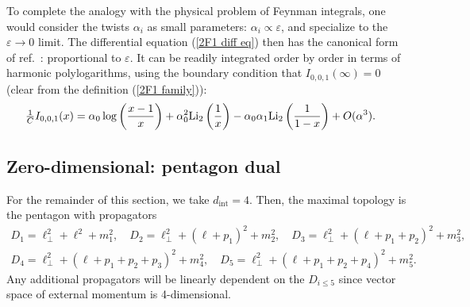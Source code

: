 \documentclass[11pt]{article}
\newcommand{\nn}{\nonumber}
\newcommand{\dint}{d_\text{int}}
\newcommand{\Li}{{\rm Li}}
\newcommand{\eps}{\varepsilon}
\begin{document}
To complete the analogy with the physical problem of Feynman integrals, one would consider the twists
$\alpha_i$ as small parameters: $\alpha_i\propto \eps$, and specialize to the $\eps\to 0$ limit.
The differential equation (\ref{2F1 diff eq}) then has the canonical form of ref.~\cite{Henn:2013pwa}: proportional to $\eps$.
It can be readily integrated order by order in terms of harmonic polylogarithms,
using the boundary condition that $I_{0,0,1}(\infty)=0$ (clear from the definition (\ref{2F1 family})):
\begin{align}
 \tfrac{1}{C}I_{0,0,1}(x) 
 &= \alpha_0 \log\left(\frac{x-1}{x}\right) 
 + \alpha_0^2 \Li_2\left(\frac{1}{x}\right) -\alpha_0\alpha_1 \Li_2\left(\frac{1}{1-x}\right)
 + O(\alpha^3).
\end{align}




%
%
%


\subsection{Zero-dimensional: pentagon dual \label{sec:cpent}}

For the remainder of this section, we take $\dint=4$. 
Then, the maximal topology is the pentagon with propagators
\begin{align} \label{eq:pentprop}
	D_1 = \ell_\perp^2 + \ell^2 + m_1^2 , 
	\quad 
	D_2 = \ell_\perp^2 + (\ell + p_1)^2 + m_2^2 ,
	\quad
	D_3 = \ell_\perp^2 + (\ell + p_1 + p_2)^2 + m_3^2 ,
	\nn \\
	D_4 = \ell_\perp^2 + (\ell + p_1 + p_2 + p_3)^2 + m_4^2 ,
	\quad
	D_5 = \ell_\perp^2 + (\ell + p_1 + p_2 + p_4)^2 + m_5^2.
\end{align}
Any additional propagators will be linearly dependent on the $D_{i\leq5}$ since vector space of external momentum is 4-dimensional. 
\end{document}
